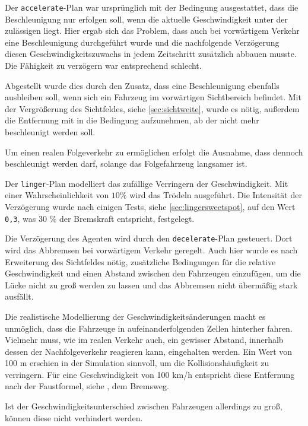 Der \texttt{accelerate}-Plan war ursprünglich mit der Bedingung ausgestattet, dass die Beschleunigung nur erfolgen soll, wenn die aktuelle Geschwindigkeit unter der zulässigen liegt.
Hier ergab sich das Problem, dass auch bei vorwärtigem Verkehr eine Beschleunigung durchgeführt wurde und die nachfolgende Verzögerung diesen Geschwindigkeitszuwachs in jedem Zeitschritt zusätzlich abbauen musste.
Die Fähigkeit zu verzögern war entsprechend schlecht.

Abgestellt wurde dies durch den Zusatz, dass eine Beschleunigung ebenfalls ausbleiben soll, wenn sich ein Fahrzeug im vorwärtigen Sichtbereich befindet.
Mit der Vergrößerung des Sichtfeldes, siehe \cref{sec:sichtweite}, wurde es nötig, außerdem die Entfernung mit in die Bedingung aufzunehmen, ab der nicht mehr beschleunigt werden soll.

Um einen realen Folgeverkehr zu ermöglichen erfolgt die Ausnahme, dass dennoch beschleunigt werden darf, solange das Folgefahrzeug langsamer ist.

Der \texttt{linger}-Plan modelliert das zufällige Verringern der Geschwindigkeit. 
Mit einer Wahrscheinlichkeit von $10 \%$ wird das Trödeln ausgeführt.
Die Intensität der Verzögerung wurde nach einigen Tests, siehe \cref{sec:lingersweetspot}, auf den Wert \texttt{0,3}, was 30 $\%$ der Bremskraft entspricht, festgelegt.

Die Verzögerung des Agenten wird durch den \texttt{decelerate}-Plan gesteuert. 
Dort wird das Abbremsen bei vorwärtigem Verkehr geregelt. 
Auch hier wurde es nach Erweiterung des Sichtfeldes nötig, zusätzliche Bedingungen für die relative Geschwindigkeit und einen Abstand zwischen den Fahrzeugen einzufügen, um die Lücke nicht zu groß werden zu lassen und das Abbremsen nicht übermäßig stark ausfällt.

Die realistische Modellierung der Geschwindigkeitsänderungen macht es unmöglich, dass die Fahrzeuge in aufeinanderfolgenden Zellen hinterher fahren.
Vielmehr muss, wie im realen Verkehr auch, ein gewisser Abstand, innerhalb dessen der Nachfolgeverkehr reagieren kann, eingehalten werden.
Ein Wert von 100 m erschien in der Simulation sinnvoll, um die Kollisionshäufigkeit zu verringern. 
Für eine Geschwindigkeit von 100 km/h entspricht diese Entfernung nach der Faustformel, siehe \cite{bremsweg}, dem Bremsweg.

Ist der Geschwindigkeitsunterschied zwischen Fahrzeugen allerdings zu groß, können diese nicht verhindert werden.

